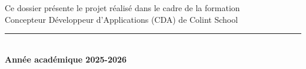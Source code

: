 \documentclass[11pt,a4paper]{book}
\begin{document}
\begin{titlepage}
    \vfill

    \begin{minipage}[b]{\textwidth}
        \centering
        {\small\color{colintDark}
        Ce dossier présente le projet réalisé dans le cadre de la formation\\
        Concepteur Développeur d'Applications (CDA) de Colint School\\
        \vspace{0.2cm}
        \rule{6cm}{0.5pt}\\
        \textbf{Année académique 2025-2026}
        }
    \end{minipage}

    \vspace{1cm}
\end{titlepage}

\tableofcontents
\newpage













\end{document}
